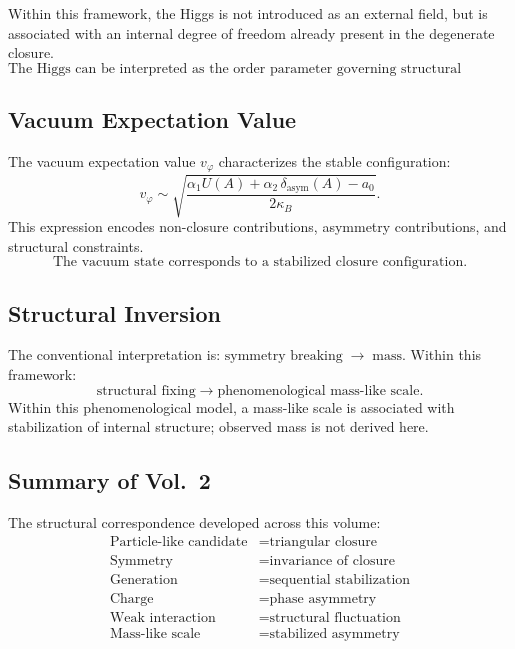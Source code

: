 Within this framework, the Higgs is not introduced as an external field,
but is associated with an internal degree of freedom
already present in the degenerate closure.
\begin{equation}
  \boxed{
    \text{The Higgs can be interpreted as the order parameter governing
    structural asymmetry.}
  }
\end{equation}

\subsection{Vacuum Expectation Value}

The vacuum expectation value $v_\varphi$ characterizes the stable configuration:
\begin{equation}
  \label{eq:vev}
  v_\varphi \sim \sqrt{
    \frac{\alpha_1 U(A) + \alpha_2\,\delta_{\mathrm{asym}}(A) - a_0}
    {2\kappa_B}
  }.
\end{equation}
This expression encodes non-closure contributions, asymmetry contributions,
and structural constraints.
\begin{equation}
  \boxed{
    \text{The vacuum state corresponds to a stabilized closure configuration.}
  }
\end{equation}

\subsection{Structural Inversion}

The conventional interpretation is:
$\text{symmetry breaking} \;\rightarrow\; \text{mass}.$
Within this framework:
\begin{equation}
  \boxed{\text{structural fixing} \;\rightarrow\; \text{phenomenological mass-like scale.}}
\end{equation}
Within this phenomenological model, a mass-like scale is associated with
stabilization of internal structure; observed mass is not derived here.

\subsection{Summary of Vol.\ 2}

The structural correspondence developed across this volume:
\begin{equation}
  \boxed{
    \begin{aligned}
      \text{Particle-like candidate} &= \text{triangular closure} \\
      \text{Symmetry}          &= \text{invariance of closure} \\
      \text{Generation}        &= \text{sequential stabilization} \\
      \text{Charge}            &= \text{phase asymmetry} \\
      \text{Weak interaction}  &= \text{structural fluctuation} \\
      \text{Mass-like scale}   &= \text{stabilized asymmetry}
    \end{aligned}
  }
\end{equation}
